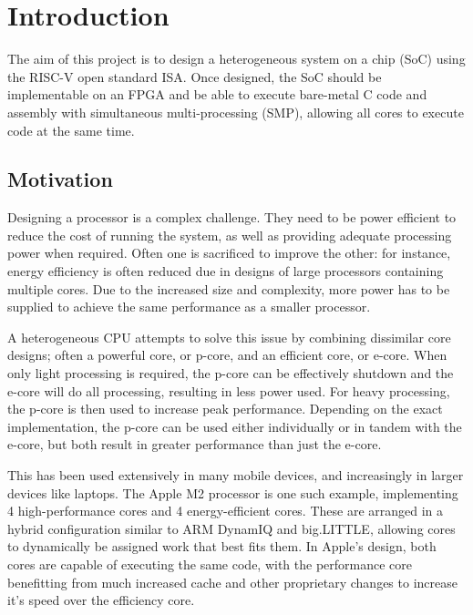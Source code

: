 \chapter{Introduction}
\label{ch:introduction}

The aim of this project is to design a heterogeneous system on a chip (SoC) using the RISC-V open standard ISA\cite{riscv-1}\cite{riscv-2}. Once designed, the SoC should be implementable on an FPGA and be able to execute bare-metal C code and assembly with simultaneous multi-processing (SMP), allowing all cores to execute code at the same time.

\section{Motivation}
Designing a processor is a complex challenge. They need to be power efficient to reduce the cost of running the system, as well as providing adequate processing power when required. Often one is sacrificed to improve the other: for instance, energy efficiency is often reduced due in designs of large processors containing multiple cores. Due to the increased size and complexity, more power has to be supplied to achieve the same performance as a smaller processor.

A heterogeneous CPU attempts to solve this issue by combining dissimilar core designs; often a powerful core, or p-core, and an efficient core, or e-core. When only light processing is required, the p-core can be effectively shutdown and the e-core will do all processing, resulting in less power used. For heavy processing, the p-core is then used to increase peak performance. Depending on the exact implementation, the p-core can be used either individually or in tandem with the e-core, but both result in greater performance than just the e-core.

This has been used extensively in many mobile devices, and increasingly in larger devices like laptops. The Apple M2 processor\cite{applem2} is one such example, implementing 4 high-performance cores and 4 energy-efficient cores. These are arranged in a hybrid configuration similar to ARM DynamIQ and big.LITTLE\cite{biglittle}, allowing cores to dynamically be assigned work that best fits them. In Apple's design, both cores are capable of executing the same code, with the performance core benefitting from much increased cache and other proprietary changes to increase it's speed over the efficiency core. 

\clearpage


